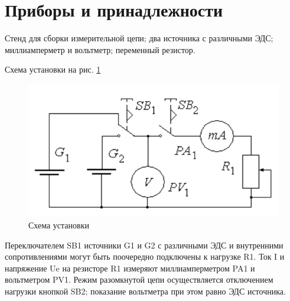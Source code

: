 \section*{Приборы и принадлежности}

Стенд для сборки измерительной цепи; два
источника с различными ЭДС; миллиамперметр и вольтметр; переменный
резистор. 

Схема установки на рис. \ref{schema}

\begin{figure}[hpt!]
	\centering
	\includegraphics[width=0.6\linewidth]{photo/schema}
	\caption{Схема установки}
	\label{schema}
\end{figure}

Переключателем SB1 источники G1 и G2 с различными ЭДС и
внутренними сопротивлениями могут быть поочередно подключены к
нагрузке R1. Ток I и напряжение Ue на резисторе R1 измеряют
миллиамперметром PA1 и вольтметром PV1. Режим разомкнутой цепи
осуществляется отключением нагрузки кнопкой SB2; показание вольтметра
при этом равно ЭДС источника. 
